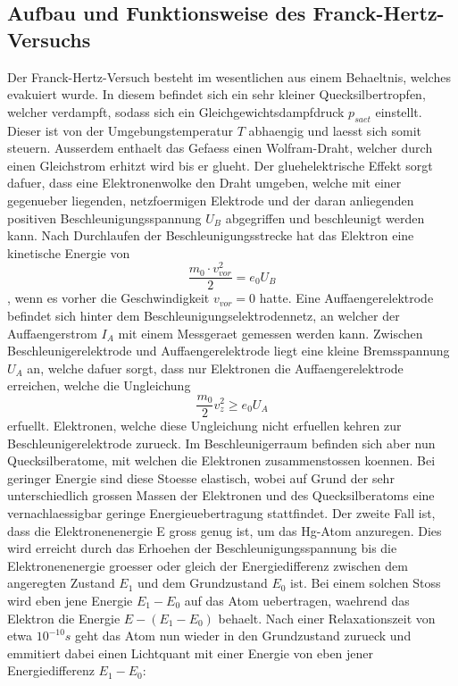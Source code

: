 \documentclass[titlepage=firstcover, captions=tableheading]{scrartcl}
\begin{document}
\subsection{Aufbau und Funktionsweise des Franck-Hertz-Versuchs}
Der Franck-Hertz-Versuch besteht im wesentlichen aus einem Behaeltnis, welches evakuiert wurde. In diesem befindet sich ein sehr kleiner Quecksilbertropfen, welcher verdampft, sodass sich ein Gleichgewichtsdampfdruck $p_{saet}$ einstellt. Dieser ist von der Umgebungstemperatur $T$ abhaengig und laesst sich somit steuern. Ausserdem enthaelt das Gefaess einen Wolfram-Draht, welcher durch einen Gleichstrom erhitzt wird bis er glueht. Der gluehelektrische Effekt sorgt dafuer, dass eine Elektronenwolke den Draht umgeben, welche mit einer gegenueber liegenden, netzfoermigen Elektrode und der daran anliegenden positiven Beschleunigungsspannung $U_B$ abgegriffen und beschleunigt werden kann. Nach Durchlaufen der Beschleunigungsstrecke hat das Elektron eine kinetische Energie von
\begin{equation}
    \frac{m_0\cdot v^2_{vor}}{2}=e_0U_B \nonumber
\end{equation}
, wenn es vorher die Geschwindigkeit $v_{vor}=0$ hatte. Eine Auffaengerelektrode befindet sich hinter dem Beschleunigungselektrodennetz, an welcher der Auffaengerstrom $I_A$ mit einem Messgeraet gemessen werden kann. Zwischen Beschleunigerelektrode und Auffaengerelektrode liegt eine kleine Bremsspannung $U_A$ an, welche dafuer sorgt, dass nur Elektronen die Auffaengerelektrode erreichen, welche die Ungleichung 
\begin{equation}
    \frac{m_0}{2}v^2_z\geq e_0U_A
\end{equation}
erfuellt. Elektronen, welche diese Ungleichung nicht erfuellen kehren zur Beschleunigerelektrode zurueck.
Im Beschleunigerraum befinden sich aber nun Quecksilberatome, mit welchen die Elektronen zusammenstossen koennen. Bei geringer Energie sind diese Stoesse elastisch, wobei auf Grund der sehr unterschiedlich grossen Massen der Elektronen und des Quecksilberatoms eine vernachlaessigbar geringe Energieuebertragung stattfindet.
\newpage \noindent Der zweite Fall ist, dass die Elektronenenergie E gross genug ist, um das Hg-Atom anzuregen. Dies wird erreicht durch das Erhoehen der Beschleunigungsspannung bis die Elektronenenergie groesser oder gleich der Energiedifferenz zwischen dem angeregten Zustand $E_1$ und dem Grundzustand $E_0$ ist. Bei einem solchen Stoss wird eben jene Energie $E_1-E_0$ auf das Atom uebertragen, waehrend das Elektron die Energie $E-(E_1-E_0)$ behaelt. Nach einer Relaxationszeit von etwa $10^{-10}s$ geht das Atom nun wieder in den Grundzustand zurueck und emmitiert dabei einen Lichtquant mit einer Energie von eben jener Energiedifferenz $E_1-E_0$:
\end{document}
